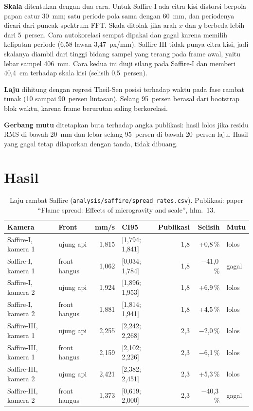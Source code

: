 \documentclass[11pt,a4paper]{report}
\begin{document}
\textbf{Skala} ditentukan dengan dua cara. Untuk Saffire-I ada citra kisi distorsi berpola papan
catur 30~mm; satu periode pola sama dengan 60~mm, dan periodenya dicari dari puncak spektrum
FFT. Skala ditolak jika arah $x$ dan $y$ berbeda lebih dari 5~persen. Cara autokorelasi sempat
dipakai dan gagal karena memilih kelipatan periode (6,58 lawan 3,47~px/mm). Saffire-III tidak
punya citra kisi, jadi skalanya diambil dari tinggi bidang sampel yang terang pada frame awal,
yaitu lebar sampel 406~mm. Cara kedua ini diuji silang pada Saffire-I dan memberi 40,4~cm
terhadap skala kisi (selisih 0,5~persen).

\textbf{Laju} dihitung dengan regresi Theil-Sen posisi terhadap waktu pada fase rambat tunak
(10 sampai 90~persen lintasan). Selang 95~persen berasal dari bootstrap blok waktu, karena
frame berurutan saling berkorelasi.

\textbf{Gerbang mutu} ditetapkan buta terhadap angka publikasi: hasil lolos jika residu RMS di
bawah 20~mm dan lebar selang 95~persen di bawah 20~persen laju. Hasil yang gagal tetap dilaporkan
dengan tanda, tidak dibuang.

\section{Hasil}

\begin{table}[ht]
\centering\small
\caption{Laju rambat Saffire (\texttt{analysis/saffire/spread\_rates.csv}). Publikasi: paper
``Flame spread: Effects of microgravity and scale'', hlm.~13.}
\label{tab:saffire}
\begin{tabular}{@{}l l r l r r l@{}}
\toprule
Kamera & Front & mm/s & CI95 & Publikasi & Selisih & Mutu\\
\midrule
Saffire-I, kamera 1 & ujung api & 1,815 & [1,794; 1,841] & 1,8 & +0,8\,\% & lolos\\
Saffire-I, kamera 1 & front hangus & 1,062 & [0,034; 1,784] & 1,8 & $-$41,0\,\% & gagal\\
Saffire-I, kamera 2 & ujung api & 1,924 & [1,896; 1,953] & 1,8 & +6,9\,\% & lolos\\
Saffire-I, kamera 2 & front hangus & 1,881 & [1,814; 1,941] & 1,8 & +4,5\,\% & lolos\\
Saffire-III, kamera 1 & ujung api & 2,255 & [2,242; 2,268] & 2,3 & $-$2,0\,\% & lolos\\
Saffire-III, kamera 1 & front hangus & 2,159 & [2,102; 2,226] & 2,3 & $-$6,1\,\% & lolos\\
Saffire-III, kamera 2 & ujung api & 2,421 & [2,382; 2,451] & 2,3 & +5,3\,\% & lolos\\
Saffire-III, kamera 2 & front hangus & 1,373 & [0,619; 2,000] & 2,3 & $-$40,3\,\% & gagal\\
\bottomrule
\end{tabular}
\end{table}
\end{document}
